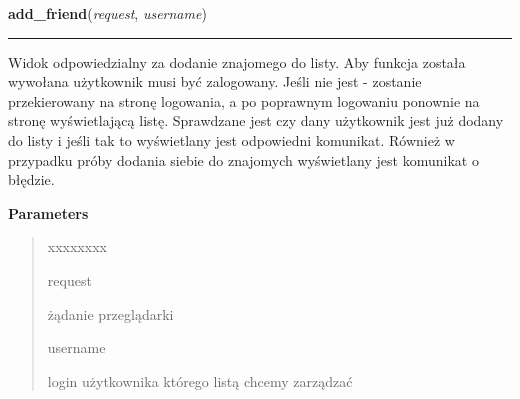 \hspace{.8\funcindent}\begin{boxedminipage}{\funcwidth}

    \raggedright \textbf{add\_friend}(\textit{request}, \textit{username})

    \vspace{-1.5ex}

    \rule{\textwidth}{0.5\fboxrule}
\setlength{\parskip}{2ex}
    Widok odpowiedzialny za dodanie znajomego do listy. Aby funkcja została
    wywołana użytkownik musi być zalogowany. Jeśli nie jest - zostanie 
    przekierowany na stronę logowania, a po poprawnym logowaniu ponownie na
    stronę wyświetlającą listę. Sprawdzane jest czy dany użytkownik jest 
    już dodany do listy i jeśli tak to wyświetlany jest odpowiedni 
    komunikat. Również w przypadku próby dodania siebie do znajomych 
    wyświetlany jest komunikat o błędzie.

\setlength{\parskip}{1ex}
      \textbf{Parameters}
      \vspace{-1ex}

      \begin{quote}
        \begin{Ventry}{xxxxxxxx}

          \item[request]

          żądanie przeglądarki

          \item[username]

          login użytkownika którego listą chcemy zarządzać

        \end{Ventry}

      \end{quote}

    \end{boxedminipage}

    \label{ass8_portal:friends:views:del_friend}

    \vspace{0.5ex}

